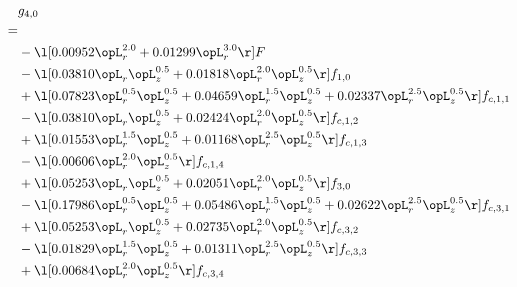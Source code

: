 \begin{alignat}{2} 
\label{eq:g_40_0} 
& g_{4,0} \nonumber \\ 
 = \\ 
& - \l[  0.00952 \opL_r^{2.0} +  0.01299 \opL_r^{3.0}  \r] F \nonumber \\ 
& - \l[  0.03810 \opL_r \opL_z^{0.5} +  0.01818 \opL_r^{2.0} \opL_z^{0.5}  \r] f_{1,0} \nonumber \\ 
& + \l[  0.07823 \opL_r^{0.5} \opL_z^{0.5} +  0.04659 \opL_r^{1.5} \opL_z^{0.5} +  0.02337 \opL_r^{2.5} \opL_z^{0.5}  \r] f_{c,1,1} \nonumber \\ 
& - \l[  0.03810 \opL_r \opL_z^{0.5} +  0.02424 \opL_r^{2.0} \opL_z^{0.5}  \r] f_{c,1,2} \nonumber \\ 
& + \l[  0.01553 \opL_r^{1.5} \opL_z^{0.5} +  0.01168 \opL_r^{2.5} \opL_z^{0.5}  \r] f_{c,1,3} \nonumber \\ 
& - \l[  0.00606 \opL_r^{2.0} \opL_z^{0.5}  \r] f_{c,1,4} \nonumber \\ 
& + \l[  0.05253 \opL_r \opL_z^{0.5} +  0.02051 \opL_r^{2.0} \opL_z^{0.5}  \r] f_{3,0} \nonumber \\ 
& - \l[  0.17986 \opL_r^{0.5} \opL_z^{0.5} +  0.05486 \opL_r^{1.5} \opL_z^{0.5} +  0.02622 \opL_r^{2.5} \opL_z^{0.5}  \r] f_{c,3,1} \nonumber \\ 
& + \l[  0.05253 \opL_r \opL_z^{0.5} +  0.02735 \opL_r^{2.0} \opL_z^{0.5}  \r] f_{c,3,2} \nonumber \\ 
& - \l[  0.01829 \opL_r^{1.5} \opL_z^{0.5} +  0.01311 \opL_r^{2.5} \opL_z^{0.5}  \r] f_{c,3,3} \nonumber \\ 
& + \l[  0.00684 \opL_r^{2.0} \opL_z^{0.5}  \r] f_{c,3,4} \nonumber \\ 
\end{alignat} 


